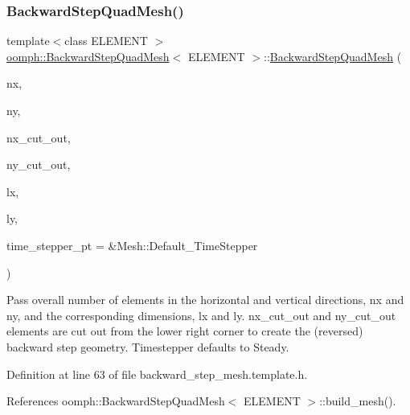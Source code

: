 \subsubsection{\texorpdfstring{Backward\+Step\+Quad\+Mesh()}{BackwardStepQuadMesh()}}
{\footnotesize\ttfamily template$<$class E\+L\+E\+M\+E\+NT $>$ \\
\hyperlink{classoomph_1_1BackwardStepQuadMesh}{oomph\+::\+Backward\+Step\+Quad\+Mesh}$<$ E\+L\+E\+M\+E\+NT $>$\+::\hyperlink{classoomph_1_1BackwardStepQuadMesh}{Backward\+Step\+Quad\+Mesh} (\begin{DoxyParamCaption}\item[{const unsigned \&}]{nx,  }\item[{const unsigned \&}]{ny,  }\item[{const unsigned \&}]{nx\+\_\+cut\+\_\+out,  }\item[{const unsigned \&}]{ny\+\_\+cut\+\_\+out,  }\item[{const double \&}]{lx,  }\item[{const double \&}]{ly,  }\item[{Time\+Stepper $\ast$}]{time\+\_\+stepper\+\_\+pt = {\ttfamily \&Mesh\+:\+:Default\+\_\+TimeStepper} }\end{DoxyParamCaption})\hspace{0.3cm}{\ttfamily [inline]}}



Pass overall number of elements in the horizontal and vertical directions, nx and ny, and the corresponding dimensions, lx and ly. nx\+\_\+cut\+\_\+out and ny\+\_\+cut\+\_\+out elements are cut out from the lower right corner to create the (reversed) backward step geometry. Timestepper defaults to Steady. 



Definition at line 63 of file backward\+\_\+step\+\_\+mesh.\+template.\+h.



References oomph\+::\+Backward\+Step\+Quad\+Mesh$<$ E\+L\+E\+M\+E\+N\+T $>$\+::build\+\_\+mesh().

\mbox{\label{classoomph_1_1BackwardStepQuadMesh_aec4e05ad80d83327050653ebabce9564}} 
